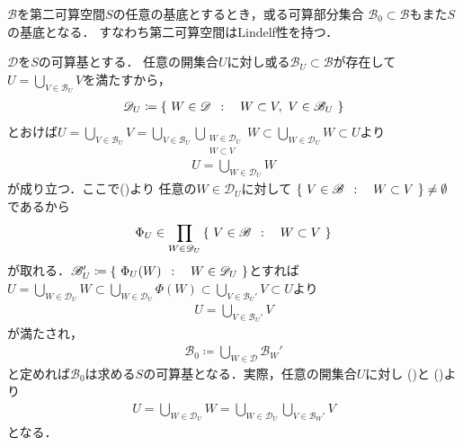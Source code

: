 	\begin{screen}
		\begin{thm}[第二可算空間の任意の基底は可算基を内包する]\label{thm:countable_base_of_second_countable_space}
			$\mathscr{B}$を第二可算空間$S$の任意の基底とするとき，或る可算部分集合
			$\mathscr{B}_0 \subset \mathscr{B}$もまた$S$の基底となる．
			すなわち第二可算空間はLindelf性を持つ．
		\end{thm}
	\end{screen}
	
	\begin{prf}
		$\mathscr{D}$を$S$の可算基とする．
		任意の開集合$U$に対し或る$\mathscr{B}_U \subset \mathscr{B}$が存在して
		$U = \bigcup_{V \in \mathscr{B}_U}V$を満たすから，
		\begin{align}
			\mathscr{D}_U \coloneqq
			\left\{\ W \in \mathscr{D}\ \, : \quad W \subset V,\ V \in \mathscr{B}_U\ \right\}
			\label{eq:thm_countable_base_of_second_countable_space_1}
		\end{align}
		とおけば$U = \bigcup_{V \in \mathscr{B}_U} V
			= \bigcup_{V \in \mathscr{B}_U} \bigcup_{\substack{W \in \mathscr{D}_U \\ W \subset V}} W
			\subset \bigcup_{W \in \mathscr{D}_U} W
			\subset U$より
		\begin{align}
			U = \bigcup_{W \in \mathscr{D}_U} W
			\label{eq:thm_countable_base_of_second_countable_space_2}
		\end{align}
		が成り立つ．ここで()より
		任意の$W \in \mathscr{D}_U$に対して
		$\left\{\ V \in \mathscr{B}\ \, : \quad W \subset V\ \right\} \neq \emptyset$であるから
		\begin{align}
			\Phi_U \in \prod_{W \in \mathscr{D}_U} \left\{\ V \in \mathscr{B}\ \, : \quad W \subset V\ \right\}
		\end{align}
		が取れる．$\mathscr{B}_U' \coloneqq \left\{\ \Phi_U(W)\ \, : \quad W \in \mathscr{D}_U\ \right\}$とすれば
		$U = \bigcup_{W \in \mathscr{D}_U} W \subset \bigcup_{W \in \mathscr{D}_U} \Phi(W)
		\subset \bigcup_{V \in \mathscr{B}_U'} V \subset U$より
		\begin{align}
			U = \bigcup_{V \in \mathscr{B}_U'} V
			\label{eq:thm_countable_base_of_second_countable_space_3}
		\end{align}
		が満たされ，
		\begin{align}
			\mathscr{B}_0 \coloneqq \bigcup_{W \in \mathscr{D}} \mathscr{B}_W'
		\end{align}
		と定めれば$\mathscr{B}_0$は求める$S$の可算基となる．実際，任意の開集合$U$に対し
		()と
		()より
		\begin{align}
			U = \bigcup_{W \in \mathscr{D}_U} W
			= \bigcup_{W \in \mathscr{D}_U} \bigcup_{V \in \mathscr{B}_W'} V
		\end{align}
		となる．
		\QED
	\end{prf}
	
